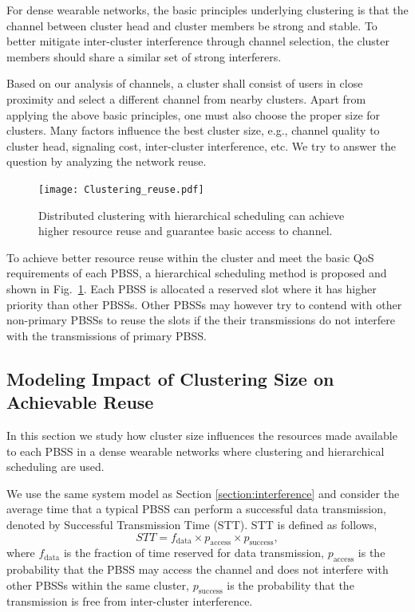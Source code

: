 \documentclass[10pt, conference, letterpaper]{IEEEtran}
\begin{document}
For dense wearable networks, the basic principles underlying clustering is that the channel between cluster head and cluster members be strong and stable. 
To better mitigate inter-cluster interference through channel selection, the cluster members should share a similar set of strong interferers. 

Based on our analysis of channels, a cluster shall consist of users in close proximity and select a different channel from nearby clusters. 
Apart from applying the above basic principles, one must also choose the proper size for clusters. 
Many factors influence the best cluster size, e.g., channel quality to cluster head, signaling cost, inter-cluster interference, etc. 
We try to answer the question by analyzing the network reuse. 


\begin{figure}
	\centering
	\texttt{[image: Clustering\_reuse.pdf]}
	\caption{Distributed clustering  with hierarchical scheduling can achieve higher resource reuse and guarantee basic access to channel.}
	\label{fig:clustering:reuse}
\end{figure}


To achieve better resource reuse within the cluster and meet the basic QoS requirements of each PBSS, a hierarchical scheduling method is proposed and shown in Fig.~\ref{fig:clustering:reuse}. 
Each PBSS is allocated a reserved slot where it has higher priority than other PBSSs. Other PBSSs may however try to contend with other non-primary PBSSs to reuse the slots if the their transmissions do not interfere with the transmissions of primary PBSS.

\subsection{Modeling Impact of Clustering Size on Achievable Reuse}
In this section we study how cluster size influences the resources made available to each PBSS in a dense wearable networks where clustering and hierarchical scheduling are used. 

We use the same system model as Section \ref{section:interference} and consider the average time that a typical PBSS can perform a successful data transmission, denoted by Successful Transmission Time (STT).
STT is defined as follows, 
\begin{equation*}
STT = f_{\mathrm{data}}\times p_{\mathrm{access}} \times p_{\mathrm{success}},
\end{equation*}
where $f_{\mathrm{data}}$ is the fraction of time reserved for data transmission, $p_{\mathrm{access}}$ is the probability that the PBSS may access the channel and does not interfere with other PBSSs within the same cluster,
$p_{\mathrm{success}}$ is the probability that the transmission is free from inter-cluster interference.
\end{document}
